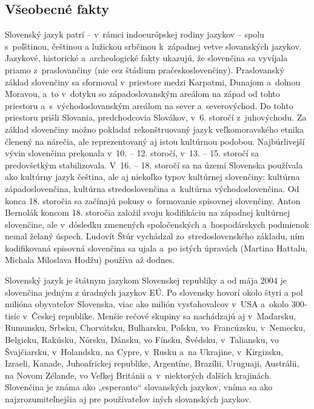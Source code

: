 \clearpage


\begin{multicols}{2}
\subsection{Všeobecné fakty}
Slovenský jazyk patrí – v~rámci indoeurópskej rodiny jazykov –
spolu s~poľštinou, češtinou a lužickou srbčinou k~západnej vetve
slovanských jazykov. Jazykové, historické a~archeologické fakty
ukazujú, že slovenčina sa vyvíjala priamo z~praslovančiny (nie cez
štádium pračeskoslovenčiny). Praslovanský základ slovenčiny sa
sformoval v~priestore medzi Karpatmi, Dunajom a~dolnou Moravou, a~to
v~dotyku so západoslovanským areálom na západ od tohto priestoru
a~s~východoslovanským areálom na sever a~severovýchod. Do tohto
priestoru prišli Slovania, predchodcovia Slovákov, v~6. storočí
z~juhovýchodu. Za základ slovenčiny možno pokladať rekonštruovaný
jazyk veľkomoravského etnika členený na nárečia, ale reprezentovaný aj istou kultúrnou podobou. Najbúrlivejší vývin
slovenčina prekonala v~10. – 12. storočí, v~13. – 15. storočí
sa predovšetkým stabilizovala. V~16. – 18. storočí sa na území
Slovenska používala ako kultúrny jazyk čeština, ale aj niekoľko
typov kultúrnej slovenčiny: kultúrna západoslovenčina, kultúrna
stredoslovenčina a~kultúrna východoslovenčina. Od konca 18.
storočia sa začínajú pokusy o~formovanie spisovnej slovenčiny.
Anton Bernolák koncom 18. storočia založil svoju kodifikáciu na
západnej kultúrnej slovenčine, ale v~dôsledku zmenených
spoločenských a~hospodárskych podmienok nemal želaný úspech.
Ľudovít Štúr vychádzal zo~stredoslovenského základu, ním kodifikovaná spisovná slovenčina sa ujala a~po istých úpravách (Martina
Hattalu, Michala Miloslava Hodžu) používa až dodnes.

Slovenský jazyk je štátnym jazykom Slovenskej republiky a od mája 2004 je slovenčina jedným z úradných jazykov EÚ. Po slovensky hovorí okolo štyri a pol milióna obyvateľov Slovenska, viac ako milión vysťahovalcov v~USA a~okolo 300-tisíc v~Českej republike. Menšie rečové skupiny sa nachádzajú aj v~Maďarsku, Rumunsku, Srbsku, Chorvátsku, Bulharsku, Poľsku, vo~Francúzsku, v~Nemecku, Belgicku, Rakúsku, Nórsku, Dánsku, vo Fínsku, Švédsku, v~Taliansku, vo Švajčiarsku, v~Holandsku, na Cypre, v~Rusku a~na Ukrajine, v~Kirgizsku, Izraeli, Kanade, Juhoafrickej republike, Argentíne, Brazílii, Uruguaji, Austrálii, na Novom Zélande, vo Veľkej Británii a~v~niektorých ďalších krajinách. Slovenčina je známa ako „esperanto“ slovanských jazykov, vníma sa ako najzrozumiteľnejšia aj pre používateľov iných slovanských jazykov.


\end{multicols}
